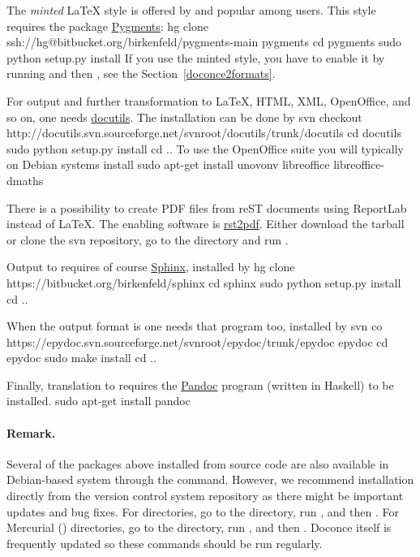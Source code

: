 \documentclass{book}
\begin{document}
The \emph{minted} {\LaTeX} style is offered by  and popular among
users. This style requires the package \href{{http://pygments.org}}{Pygments}:
\bsys
hg clone ssh://hg@bitbucket.org/birkenfeld/pygments-main pygments
cd pygments
sudo python setup.py install
\esys
If you use the minted style, you have to enable it by running
 and then , see
the Section~\ref{doconce2formats}.

For  output and further transformation to {\LaTeX}, HTML, XML,
OpenOffice, and so on, one needs \href{{http://docutils.sourceforge.net}}{docutils}.
The installation can be done by
\bsys
svn checkout http://docutils.svn.sourceforge.net/svnroot/docutils/trunk/docutils
cd docutils
sudo python setup.py install
cd ..
\esys
To use the OpenOffice suite you will typically on Debian systems install
\bsys
sudo apt-get install unovonv libreoffice libreoffice-dmaths
\esys

There is a possibility to create PDF files from reST documents
using ReportLab instead of {\LaTeX}. The enabling software is
\href{{http://code.google.com/p/rst2pdf}}{rst2pdf}. Either download the tarball
or clone the svn repository, go to the  directory and
run .


Output to  requires of course \href{{http://sphinx.pocoo.org}}{Sphinx},
installed by
\bsys
hg clone https://bitbucket.org/birkenfeld/sphinx
cd sphinx
sudo python setup.py install
cd ..
\esys

When the output format is  one needs that program too, installed
by
\bsys
svn co https://epydoc.svn.sourceforge.net/svnroot/epydoc/trunk/epydoc epydoc
cd epydoc
sudo make install
cd ..
\esys

Finally, translation to  requires the
\href{{http://johnmacfarlane.net/pandoc/}}{Pandoc} program
(written in Haskell) to be installed.
\bsys
sudo apt-get install pandoc
\esys

\paragraph{Remark.}
Several of the packages above installed from source code
are also available in Debian-based system through the
 command. However, we recommend installation directly
from the version control system repository as there might be important
updates and bug fixes. For  directories, go to the directory,
run , and then . For
Mercurial () directories, go to the directory, run
, and then .
Doconce itself is frequently updated so these commands should be
run regularly.

\printindex
\end{document}
